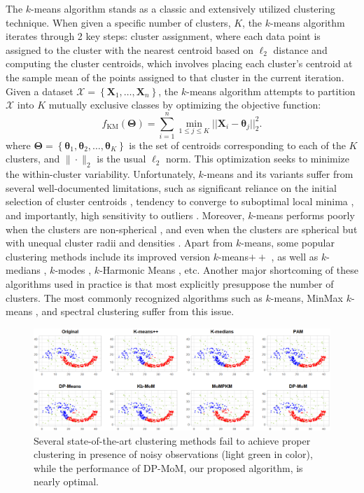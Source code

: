 \documentclass{article}
\newcommand{\bX}{\boldsymbol{X}}
\newcommand{\btheta}{\boldsymbol{\theta}}
\newcommand{\bTheta}{\boldsymbol{\Theta}}
\begin{document}
The $k$-means algorithm \citep{llyod-kmeans} stands as a classic and extensively utilized clustering technique. When given a specific number of clusters, $K$, the $k$-means algorithm iterates through 2 key steps: cluster assignment, where each data point is assigned to the cluster with the nearest centroid based on $\ell_2$ distance and computing the cluster centroids, which involves placing each cluster's centroid at the sample mean of the points assigned to that cluster in the current iteration. Given a dataset $\mathcal{X}=\left\{{\bX}_1, \ldots, {\bX}_n\right\}$, the $k$-means algorithm attempts to partition $\mathcal{X}$ into $K$ mutually exclusive classes by optimizing the objective function: 
\begin{equation}
    f_{\operatorname{KM}}(\bTheta) = \sum_{i=1}^n \displaystyle\min_{1 \leq j \leq K} ||\bX_i-\btheta_j||_2^2.
\end{equation}
where $\bTheta=\left\{\btheta_1, \btheta_2, \ldots, \btheta_K\right\}$ is the set of centroids corresponding to each of the $K$ clusters, and $\|\cdot\|_2$ is the usual $\ell_2$ norm. This optimization seeks to minimize the within-cluster variability.
Unfortunately, $k$-means and its variants suffer from several well-documented limitations, such as significant reliance on the initial selection of cluster centroids \citep{pmlr-v70-bachem17b}, tendency to converge to suboptimal local minima \citep{xu-lange-2019}, and importantly, high sensitivity to outliers \citep{K-means-outliers}. Moreover, $k$-means performs poorly when the clusters are non-spherical \citep{spectral-andrew-ng}, and even when the clusters are spherical but with unequal cluster radii and densities \citep{Raykov2016-mg}. Apart from $k$-means, some popular clustering methods include its improved version $k$-means$++$ \citep{Arthur2007kmeansTA}, as well as $k$-medians \citep{bradley-k-median,k-median}, $k$-modes \citep{Chaturvedi2001}, $k$-Harmonic Means \citep{Zhang-1999-KHM}, etc.
Another major shortcoming of these algorithms used in practice is that most explicitly presuppose the number of clusters. The most commonly recognized algorithms such as $k$-means, MinMax $k$-means \citep{minmax-km}, and spectral clustering \citep{spectral-andrew-ng} suffer from this issue. 

\begin{figure}[t]
    \centering
    \includegraphics[width = \textwidth]{Diagrams/plot-jain-sim-comparison-0.7.png}
    \caption{Several state-of-the-art clustering methods fail to achieve proper clustering in presence of noisy observations (light green in color), while the performance of DP-MoM, our proposed algorithm, is nearly optimal.}
    \label{fig:jain-out}
\end{figure}
\end{document}
